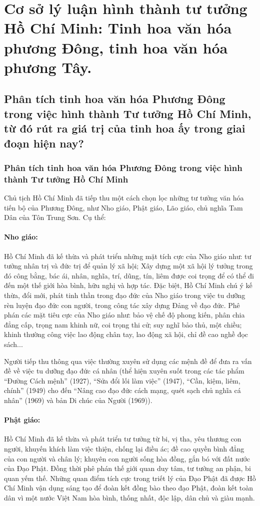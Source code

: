 \section{Cơ sở lý luận hình thành tư tưởng Hồ Chí Minh: Tinh hoa văn hóa phương Đông, tinh hoa văn hóa phương Tây.}

\subsection{Phân tích tinh hoa văn hóa Phương Đông trong việc hình thành Tư tưởng Hồ Chí Minh, từ đó rút ra giá trị của tinh hoa ấy trong giai đoạn hiện nay?}

\subsubsection{Phân tích tinh hoa văn hóa Phương Đông trong việc hình thành Tư tưởng Hồ Chí Minh}
Chủ tịch Hồ Chí Minh đã tiếp thu một cách chọn lọc những tư tưởng văn hóa tiến bộ của Phương Đông, như Nho giáo, Phật giáo, Lão giáo, chủ nghĩa Tam Dân của Tôn Trung Sơn. Cụ thể:

\paragraph{Nho giáo:}
Hồ Chí Minh đã kế thừa và phát triển những mặt tích cực của Nho giáo như: tư tưởng nhân trị và đức trị để quản lý xã hội; Xây dựng một xã hội lý tưởng trong đó công bằng, bác ái, nhân, nghĩa, trí, dũng, tín, liêm được coi trọng để có thể đi đến một thế giới hòa bình, hữu nghị và hợp tác. Đặc biệt, Hồ Chí Minh chú ý kế thừa, đổi mới, phát tinh thần trong đạo đức của Nho giáo trong việc tu dưỡng rèn luyện đạo đức con người, trong công tác xây dựng Đảng về đạo đức. Phê phán các mặt tiêu cực của Nho giáo như: bảo vệ chế độ phong kiến, phân chia đẳng cấp, trọng nam khinh nữ, coi trọng thi cử; suy nghĩ bảo thủ, một chiều; khinh thường công việc lao động chân tay, lao động xã hội, chỉ đề cao nghề đọc sách...

Người tiếp thu thông qua việc thường xuyên sử dụng các mệnh đề để đưa ra vấn đề về việc tu dưỡng đạo đức cá nhân (thể hiện xuyên suốt trong các tác phẩm ``Đường Cách mệnh'' (1927), ``Sửa đổi lối làm việc'' (1947), ``Cần, kiệm, liêm, chính'' (1949) cho đến ``Nâng cao đạo đức cách mạng, quét sạch chủ nghĩa cá nhân'' (1969) và bản Di chúc của Người (1969)).

\paragraph{Phật giáo:}
Hồ Chí Minh đã kế thừa và phát triển tư tưởng từ bi, vị tha, yêu thương con người, khuyến khích làm việc thiện, chống lại điều ác; đề cao quyền bình đẳng của con người và chân lý; khuyên con người sống hòa đồng, gắn bó với đất nước của Đạo Phật. Đồng thời phê phán thế giới quan duy tâm, tư tưởng an phận, bi quan yếm thế. Những quan điểm tích cực trong triết lý của Đạo Phật đã được Hồ Chí Minh vận dụng sáng tạo để đoàn kết đồng bào theo đạo Phật, đoàn kết toàn dân vì một nước Việt Nam hòa bình, thống nhất, độc lập, dân chủ và giàu mạnh.

